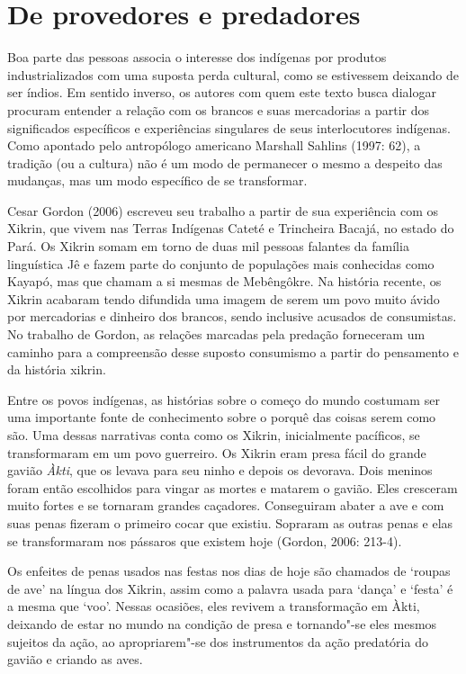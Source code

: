 \section{De provedores e predadores} 

Boa parte das pessoas associa o interesse dos indígenas por produtos
industrializados com uma suposta perda cultural, como se estivessem
deixando de ser índios. Em sentido inverso, os autores com quem este
texto busca dialogar procuram entender a relação com os brancos e suas
mercadorias a partir dos significados específicos e experiências
singulares de seus interlocutores indígenas. Como apontado pelo
antropólogo americano Marshall Sahlins (1997: 62), a tradição (ou a
cultura) não é um modo de permanecer o mesmo a despeito das mudanças,
mas um modo específico de se transformar.

Cesar Gordon (2006) escreveu seu trabalho a partir de sua experiência
com os Xikrin, que vivem nas Terras Indígenas Cateté e Trincheira
Bacajá, no estado do Pará. Os Xikrin somam em torno de duas mil pessoas
falantes da família linguística Jê e fazem parte do conjunto de
populações mais conhecidas como Kayapó, mas que chamam a si mesmas de
Mebêngôkre. Na história recente, os Xikrin acabaram tendo difundida uma
imagem de serem um povo muito ávido por mercadorias e dinheiro dos
brancos, sendo inclusive acusados de consumistas. No trabalho de
Gordon, as relações marcadas pela predação forneceram um caminho para a
compreensão desse suposto consumismo a partir do pensamento e da
história xikrin.

Entre os povos indígenas, as histórias sobre o começo do mundo costumam
ser uma importante fonte de conhecimento sobre o porquê das coisas
serem como são. Uma dessas narrativas conta como os Xikrin,
inicialmente pacíficos, se transformaram em um povo guerreiro. Os
Xikrin eram presa fácil do grande gavião \emph{Àkti}, que os levava para seu
ninho e depois os devorava. Dois meninos foram então escolhidos para
vingar as mortes e matarem o gavião. Eles cresceram muito fortes e se
tornaram grandes caçadores. Conseguiram abater a ave e com suas penas
fizeram o primeiro cocar que existiu. Sopraram as outras penas e elas
se transformaram nos pássaros que existem hoje (Gordon, 2006: 213-4). 

Os enfeites de penas usados nas festas nos dias de hoje são chamados de
`roupas de ave' na língua dos Xikrin, assim como a palavra usada para
`dança' e `festa' é a mesma que `voo'. Nessas ocasiões, eles revivem a
transformação em Àkti, deixando de estar no mundo na condição de presa e
tornando"-se eles mesmos sujeitos da ação, ao apropriarem"-se dos
instrumentos da ação predatória do gavião e criando as aves.

